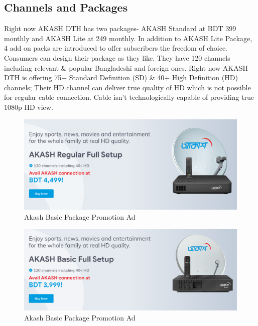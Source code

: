 \begin{spacing}{1.0}
\subsection{Channels and Packages}
Right now AKASH DTH has two packages- AKASH Standard at BDT 399 monthly and AKASH Lite at 249 monthly. In addition to AKASH Lite Package, 4 add on packs are introduced to offer subscribers the freedom of choice. Consumers can design their package as they like.
They have 120 channels including relevant \& popular Bangladeshi and foreign ones. 
Right now AKASH DTH is offering 75+ Standard Definition (SD) \& 40+ High Definition (HD) channels; Their HD channel can deliver true quality of HD which is not possible for regular cable connection. Cable isn't technologically capable of providing true 1080p HD view. 
\begin{figure}[H]
	\centering
	\includegraphics[width=\textwidth]{package1}
	\caption{Akash Basic Package Promotion Ad}
	\label{fig:package1}
\end{figure}

\begin{figure}[H]
	\centering
	\includegraphics[width=\textwidth]{package2}
	\caption{Akash Basic Package Promotion Ad}
	\label{fig:package2}
\end{figure}


\end{spacing}
